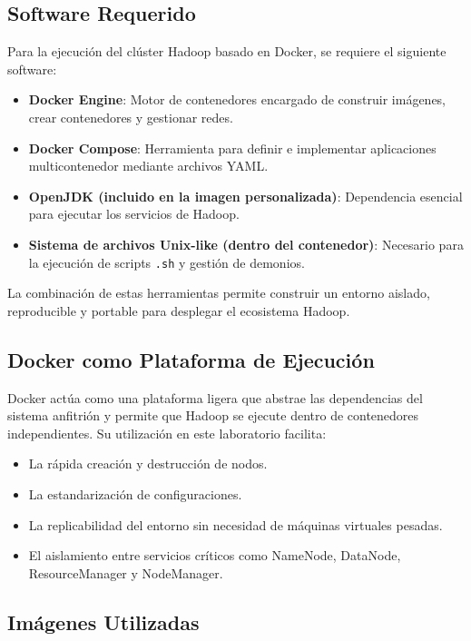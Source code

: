 \subsection{Software Requerido}

Para la ejecución del clúster Hadoop basado en Docker, se requiere el siguiente software:

\begin{itemize}
    \item \textbf{Docker Engine}: Motor de contenedores encargado de construir imágenes, crear contenedores y gestionar redes.
    \item \textbf{Docker Compose}: Herramienta para definir e implementar aplicaciones multicontenedor mediante archivos YAML.
    \item \textbf{OpenJDK (incluido en la imagen personalizada)}: Dependencia esencial para ejecutar los servicios de Hadoop.
    \item \textbf{Sistema de archivos Unix-like (dentro del contenedor)}: Necesario para la ejecución de scripts \texttt{.sh} y gestión de demonios.
\end{itemize}

La combinación de estas herramientas permite construir un entorno aislado, reproducible y portable para desplegar el ecosistema Hadoop.

\subsection{Docker como Plataforma de Ejecución}

Docker actúa como una plataforma ligera que abstrae las dependencias del sistema anfitrión y permite que Hadoop se ejecute dentro de contenedores independientes. Su utilización en este laboratorio facilita:

\begin{itemize}
    \item La rápida creación y destrucción de nodos.
    \item La estandarización de configuraciones.
    \item La replicabilidad del entorno sin necesidad de máquinas virtuales pesadas.
    \item El aislamiento entre servicios críticos como NameNode, DataNode, ResourceManager y NodeManager.
\end{itemize}

\subsection{Imágenes Utilizadas}

